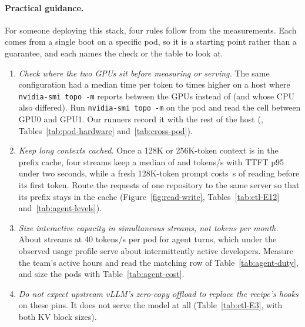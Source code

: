 \paragraph{Practical guidance.}
For someone deploying this stack, four rules follow from the measurements. Each comes from a single boot on a specific
pod, so it is a starting point rather than a guarantee, and each names the check or the table to look at.
\begin{enumerate}
\item \emph{Check where the two GPUs sit before measuring or serving.} The same configuration had a median time per
token  to  times higher on a host where
\texttt{nvidia-smi topo -m} reports \texttt{} between the GPUs instead of
\texttt{} (and whose CPU also differed). Run \texttt{nvidia-smi topo -m} on the pod and
read the cell between GPU0 and GPU1. Our runners record it with the rest of the host (,
Tables~\ref{tab:pod-hardware} and~\ref{tab:cross-pod}).
\item \emph{Keep long contexts cached.} Once a 128K or 256K-token context is in the prefix cache, four streams keep a
median of  and  tokens/s with TTFT p95
under two seconds, while a fresh 128K-token prompt costs \,s
of reading before its first token. Route the requests of one repository to the same server so that its prefix stays
in the cache (Figure~\ref{fig:read-write}, Tables~\ref{tab:ctl-E12} and~\ref{tab:agent-levels}).
\item \emph{Size interactive capacity in simultaneous streams, not tokens per month.} About
 streams at 40 tokens/s per pod for agent turns, which under the observed usage profile
serve about  intermittently active developers. Measure the team's active hours
and read the matching row of Table~\ref{tab:agent-duty}, and size the pods with Table~\ref{tab:agent-cost}.
\item \emph{Do not expect upstream vLLM's zero-copy offload to replace the recipe's hooks} on these pins. It does not
serve the model at all (Table~\ref{tab:ctl-E3}, with both KV block sizes).
\end{enumerate}

